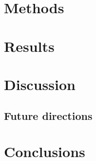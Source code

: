 \documentclass[twocolumn,twocolappendix]{aastex63}
\begin{document}


\section{Methods}

\section{Results}

\section{Discussion}

\subsection{Future directions}

\section{Conclusions}

\end{document}
